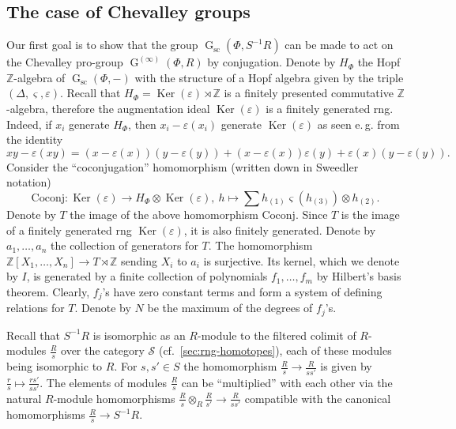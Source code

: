 \documentclass[oneside, 11pt]{amsart}
\numberwithin{equation}{section}
\theoremstyle{definition}
\theoremstyle{remark}
\DeclareMathOperator\Ker{Ker}
\DeclareMathOperator\GG{G}
\newcommand{\ZZ}{\mathbb{Z}}
\begin{document}
\subsection{The case of Chevalley groups} \label{sec:local-Chevalley}
Our first goal is to show that the group \(\GG_{\mathrm{sc}}(\Phi, S^{-1} R)\) can be made to act on the Chevalley pro-group \(\GG^{(\infty)}(\Phi, R)\) by conjugation. Denote by \(H_\Phi\) the Hopf \(\ZZ\)-algebra of \(\GG_{\mathrm{sc}}(\Phi, -)\) with the structure of a Hopf algebra given by the triple $(\Delta, \varsigma, \varepsilon)$. Recall that \(H_\Phi= \Ker(\varepsilon) \rtimes \ZZ\) is a finitely presented commutative \(\ZZ\)-algebra, therefore the augmentation ideal $\Ker(\varepsilon)$ is a finitely generated rng. Indeed, if $x_i$ generate $H_\Phi$, then $x_i - \varepsilon(x_i)$ generate $\Ker(\varepsilon)$ as seen e.\,g. from the identity
\[xy - \varepsilon(xy) = (x - \varepsilon(x)) (y - \varepsilon(y)) + (x - \varepsilon(x)) \varepsilon(y) + \varepsilon(x) (y - \varepsilon(y)).\]
Consider the ``coconjugation'' homomorphism (written down in Sweedler notation)
\[\mathrm{Coconj} \colon \Ker(\varepsilon) \to H_\Phi \otimes \Ker(\varepsilon),\ h \mapsto \sum h_{(1)} \varsigma(h_{(3)}) \otimes h_{(2)}.\]
Denote by $T$ the image of the above homomorphism $\mathrm{Coconj}$.
Since $T$ is the image of a finitely generated rng \(\Ker(\varepsilon)\), it is also finitely generated.
Denote by \(a_1, \ldots, a_n\) the collection of generators for $T$. The homomorphism \(\ZZ[X_1, \ldots, X_n] \to T \rtimes \ZZ\) sending $X_i$ to $a_i$ is surjective. Its kernel, which we denote by \(I\), is generated by a finite collection of polynomials \(f_1, \ldots, f_m\) by Hilbert's basis theorem. Clearly, \(f_j\)'s have zero constant terms and form a system of defining relations for $T$. Denote by \(N\) be the maximum of the degrees of \(f_j\)'s.

Recall that \(S^{-1} R\) is isomorphic as an $R$-module to the filtered colimit of \(R\)-modules \(\frac Rs\) over the category $\mathcal{S}$ (cf.~\cref{sec:rng-homotopes}), each of these modules being isomorphic to $R$. For $s, s' \in S$ the homomorphism \(\frac R{s} \to \frac R{ss'}\) is given by $\tfrac{r}{s} \mapsto \tfrac{rs'}{ss'}$. The elements of modules $\frac Rs$ can be ``multiplied'' with each other via the natural $R$-module homomorphisms $\frac R s \otimes_R \frac R {s'} \to \frac R {ss'}$ compatible with the canonical homomorphisms $\frac R s \to S^{-1}R$.
\end{document}
